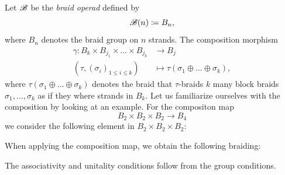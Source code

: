     \begin{eg}\label{braidop} Let $\mathscr{B}$ be the {\em braid operad} defined by
        \[
            \mathscr{B}(n) \coloneqq B_n,
        \]
        where $B_n$ denotes the braid group on $n$ strands. The composition
        morphism 
        \begin{align*}
            \gamma \colon B_k \times B_{j_1} \times \dots \times B_{j_k} &\to B_{j} \\
            (\tau, (\sigma_i)_{1 \leq i \leq k}) &\mapsto \tau(\sigma_1 \oplus \dots \oplus \sigma_k),
        \end{align*}
        where $\tau(\sigma_1 \oplus \dots \oplus \sigma_k)$ denotes the braid
        that $\tau$-braids $k$ many block braids $\sigma_1, \dots, \sigma_k$ as
        if they where strands in $B_k$. Let us familiarize ourselves with the
        composition by looking at an example. For the compositon map 
        \[
            B_2\times B_2 \times B_2 \to B_4
        \]
        we consider the following element in $B_2\times B_2 \times B_2$:
        \begin{center}
        \end{center}
        When applying the composition map, we obtain the following braiding:
        \begin{center}
        \end{center}
        The associativity and unitality conditions follow from the group
        conditions.
    \end{eg}

